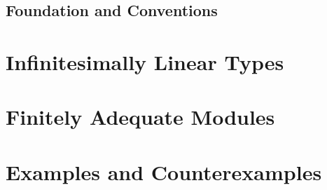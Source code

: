 \documentclass{../util/zariski-small}
\begin{document}
\subsection{Foundation and Conventions}\label{ss:foundation}


\section{Infinitesimally Linear Types}
\label{infinitesimally-linear-section}


\section{Finitely Adequate Modules}
\label{adequate-section}


\section{Examples and Counterexamples}
\label{examples-section}


%

\printbibliography
\end{document}
